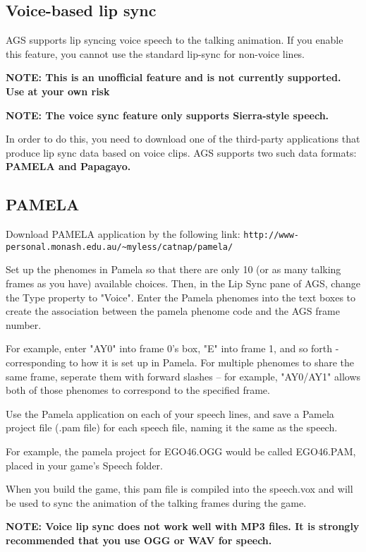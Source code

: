 \subsection{Voice-based lip sync}%

AGS supports lip syncing voice speech to the talking animation. If you enable this
feature, you cannot use the standard lip-sync for non-voice lines.

\bf{NOTE: This is an unofficial feature and is not currently supported. Use at
your own risk}

\bf{NOTE:} The voice sync feature only supports Sierra-style speech.

In order to do this, you need to download one of the third-party applications that produce
lip sync data based on voice clips.
AGS supports two such data formats: \bf{PAMELA} and \bf{Papagayo}.

\subsection{PAMELA}

Download PAMELA application by the following link:
\verb$http://www-personal.monash.edu.au/~myless/catnap/pamela/$

Set up the phenomes in Pamela so that there are only 10 (or as many talking frames as you have)
available choices. Then, in the Lip Sync pane of AGS, change the Type property to "Voice".
Enter the Pamela phenomes into the text boxes to create the association
between the pamela phenome code and the AGS frame number.

For example, enter "AY0" into frame 0's box, "E" into frame 1, and so forth - corresponding
to how it is set up in Pamela. For multiple phenomes to share the same frame, seperate them
with forward slashes -- for example, "AY0/AY1" allows both of those phenomes to correspond
to the specified frame.

Use the Pamela application on each of your speech lines, and save a Pamela project file
(.pam file) for each speech file, naming it the same as the speech.

For example, the pamela project for  EGO46.OGG  would be called  EGO46.PAM, placed
in your game's Speech folder.

When you build the game, this pam file is compiled into the speech.vox and will be used
to sync the animation of the talking frames during the game.

\bf{NOTE:} Voice lip sync does not work well with MP3 files. It is strongly recommended
that you use OGG or WAV for speech.


